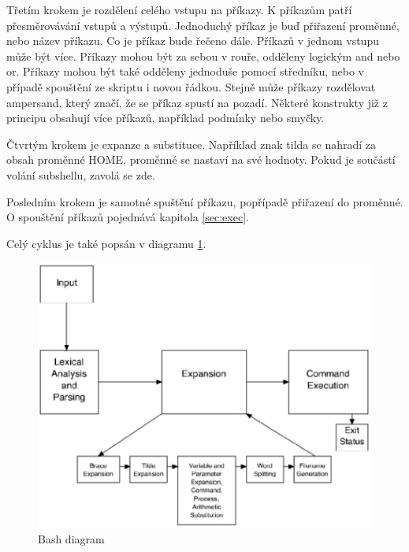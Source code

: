 \documentclass[thesis=M,czech]{FITthesis}[2012/06/26]
\begin{document}
Třetím krokem je rozdělení celého vstupu na příkazy. K příkazům patří přesměrovávání vstupů a výstupů. Jednoduchý příkaz je buď přiřazení proměnné, nebo název příkazu. Co je příkaz bude řečeno dále. Příkazů v jednom vstupu může být více. Příkazy mohou být za sebou v rouře, odděleny logickým and nebo or. Příkazy mohou být také odděleny jednoduše pomocí středníku, nebo v případě spouštění ze skriptu i novou řádkou. Stejně může příkazy rozdělovat ampersand, který značí,  že se příkaz spustí na pozadí. Některé konstrukty již z principu obsahují více příkazů, například podmínky nebo smyčky.

Čtvrtým krokem je expanze a substituce. Například znak tilda se nahradí za obsah proměnné HOME, proměnné se nastaví na své hodnoty. Pokud je součástí volání subshellu, zavolá se zde.

Posledním  krokem je samotné spuštění příkazu, popřípadě přiřazení do proměnné. O spouštění příkazů pojednává kapitola \ref{sec:exec}.

Celý cyklus je také popsán v diagramu \ref{fig:bash_diag}.

\begin{figure}[htb]\centering
	\includegraphics[width=\textwidth]{./images/bash-article-diagram}
	\caption{Bash diagram}
	\label{fig:bash_diag}
\end{figure}



\end{document}
